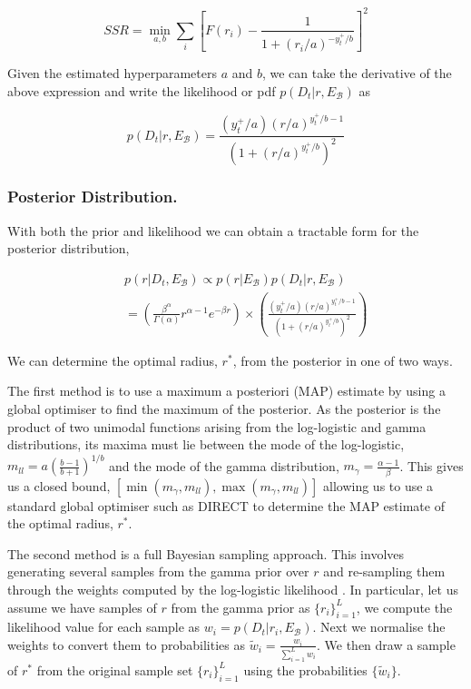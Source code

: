 \documentclass[preprint]{elsarticle}
\begin{document}
\begin{linenomath*}
\begin{equation}
SSR=\underset{{a,b}}{\min} \sum_i{\left[F(r_i)-\frac{1}{1+(r_i/a)^{-y_t^+/b}}\right]^2}
\end{equation} 
\end{linenomath*}
Given the estimated hyperparameters $a$ and $b$, we can take the derivative of the above expression and write the likelihood or pdf $p(D_t|r,E_{\mathcal{B}})$ as
\begin{linenomath*}
\begin{equation}
p(D_t|r,E_{\mathcal{B}})=\frac{(y_t^+/{a})(r/a)^{y_t^+/b-1}}{(1+(r/a)^{y_t^+/b})^2}\label{eqn:likelihood}
\end{equation}
\end{linenomath*}
\subsubsection{Posterior Distribution.}

With both the prior and likelihood we can obtain a tractable form for the posterior distribution,
\begin{linenomath*}
\begin{eqnarray}
&&p(r|D_t,E_{\mathcal{B}})\propto p(r|E_{\mathcal{B}})p(D_t|r,E_{\mathcal{B}})\nonumber \\
&&= \left(\frac{\beta^\alpha}{\Gamma(\alpha)}r^{\alpha-1}e^{-\beta r}\right)\times\left(\frac{(y_t^+/{a})(r/a)^{y_t^+/b-1}}{(1+(r/a)^{y_t^+/b})^2}\right) \label{eqn:posterior}
\end{eqnarray}
\end{linenomath*}
We can determine the optimal radius, $r^*$, from the posterior in one of two ways. 

The first method is to use a maximum a posteriori (MAP) estimate by using a global optimiser to find the maximum of the posterior. As the posterior is the product of two unimodal functions arising from the log-logistic and gamma distributions, its maxima must lie between the mode of the log-logistic, $m_{ll}=a\left(\frac{b-1}{b+1}\right)^{1/b}$ and the mode of the gamma distribution, $m_{\gamma}=\frac{\alpha-1}{\beta}$. This gives us a closed bound, $[\min(m_{\gamma},m_{ll}),\max(m_{\gamma},m_{ll})]$ allowing us to use a standard global optimiser such as DIRECT \citep{jones2001direct} to determine the MAP estimate of the optimal radius, $r^*$.

The second method is a full Bayesian sampling approach. This involves generating several samples from the gamma prior over $r$ and re-sampling them through the weights computed by the log-logistic likelihood \citep{smith1992bayesian}. In particular, let us assume we have samples of $r$ from the gamma prior as $\{r_i\}_{i=1}^{L}$, we compute the likelihood value for each sample as $w_i = p(D_t|r_i,E_{\mathcal{B}})$. Next we normalise the weights to convert them to probabilities as $\tilde{w}_i=\frac{w_i}{\sum_{i=1}^{L}w_i}$. We then draw a sample of $r^*$ from the original sample set $\{r_i\}_{i=1}^{L}$ using the probabilities $\{\tilde{w}_i\}$.
\end{document}
